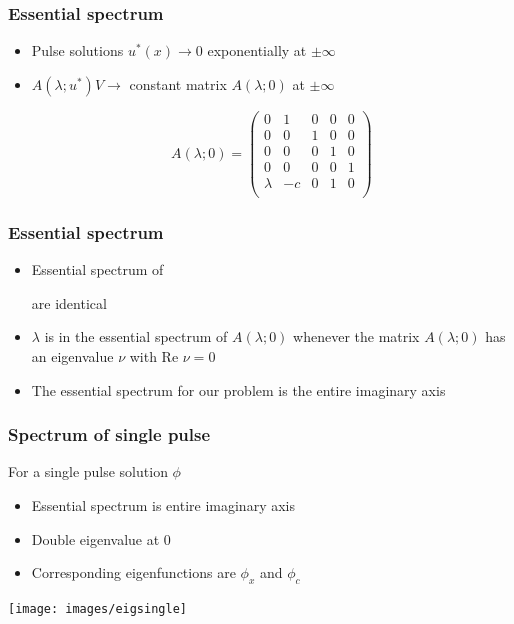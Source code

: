 \documentclass[16pt]{beamer}
\begin{document}
\begin{frame}
	\frametitle{Essential spectrum}
	\fontsize{16}{7.2}\selectfont
	\begin{itemize}
		\item Pulse solutions $u^*(x) \rightarrow 0$ exponentially at $\pm \infty$
		\item $A(\lambda; u^*)V \rightarrow$ constant matrix $A(\lambda; 0)$ at $\pm \infty$
		\begin{center}
		\[
			A(\lambda;0) = 
			\begin{pmatrix}
			0 & 1 & 0 & 0 & 0\\
			0 & 0 & 1 & 0 & 0\\
			0 & 0 & 0 & 1 & 0\\
			0 & 0 & 0 & 0 & 1\\
			\lambda & -c & 0 & 1 & 0 \\ 
			\end{pmatrix}
		\]
		\end{center}
	\end{itemize}
\end{frame}

\begin{frame}
	\frametitle{Essential spectrum}
	\fontsize{16}{7.2}\selectfont
	\begin{itemize}
		\item<1-> Essential spectrum of 
		are identical
	\vspace{0.5cm}
		\item<2-> $\lambda$ is in the essential spectrum of $A(\lambda; 0)$ whenever the matrix $A(\lambda; 0)$ has an eigenvalue $\nu$ with $\text{Re } \nu = 0$

	\vspace{0.5cm}
		\item<3->The essential spectrum for our problem is the entire imaginary axis

	\end{itemize}
\end{frame}


\begin{frame}
	\frametitle{Spectrum of single pulse}
	\fontsize{16}{7.2}\selectfont
	For a single pulse solution $\phi$
	\vspace{0.5cm}
	\begin{itemize}
		\item Essential spectrum is entire imaginary axis
		\vspace{0.5cm}
		\item Double eigenvalue at 0
		\vspace{0.5cm}
		\item Corresponding eigenfunctions are $\phi_x$ and $\phi_c$
	\end{itemize}
	\begin{center}
		\texttt{[image: images/eigsingle]}
	\end{center}
\end{frame}
\end{document}
